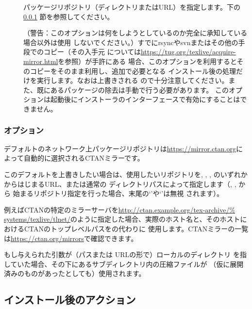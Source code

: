 \documentclass[uplatex,dvipdfmx,12pt]{jsarticle}
\begin{document}
\begin{description}
\item[]
パッケージリポジトリ（ディレクトリまたはURL）を指定します。下の\ref{sec:location}%
節を参照してください。

\item[]
（警告：このオプションは何をしようとしているのか完全に承知している場合以外は使用
しないでください。）すでにrsyncやsvnまたはその他の手段で\TL のコピー（その入手元
については\url{https://tug.org/texlive/acquire-mirror.html}を参照）が手許にある
場合、このオプションを利用するとそのコピーをそのまま利用し、追加で必要となる
インストール後の処理だけを実行します。なおは上書きされる
ので十分注意してください。また、既にあるパッケージの除去は手動で行う必要があります。
このオプションは起動後にインストーラのインターフェースで有効にすることはできません。
\end{description}

\subsubsection{オプション}
\label{sec:location}

デフォルトのネットワーク上パッケージリポジトリは\url{https://mirror.ctan.org}に
よって自動的に選択されるCTANミラーです。

このデフォルトを上書きしたい場合は、使用したいリポジトリを, , , のいずれかからはじまるURL、または通常の
ディレクトリパスによって指定します（, , から
始まるリポジトリ指定を行った場合、末尾の`\code{/}'や`'は無視
されます）。

例えばCTANの特定のミラーサーバを\url{http://ctan.example.org/tex-archive/%
systems/texlive/tlnet/}のように指定した場合、実際のホスト名と、そのホストに
おけるCTANのトップレベルパスをの代わりに
使用します。CTANミラーの一覧は\url{https://ctan.org/mirrors}で確認できます。

もし与えられた引数が（パスまたは URLの形で）ローカルのディレクトリ
を指していた場合、その下にあるサブディレクトリ内の圧縮ファイルが
（仮に展開済みのものがあったとしても）使用されます。

\subsection{インストール後のアクション}
\label{sec:postinstall}
\end{document}
